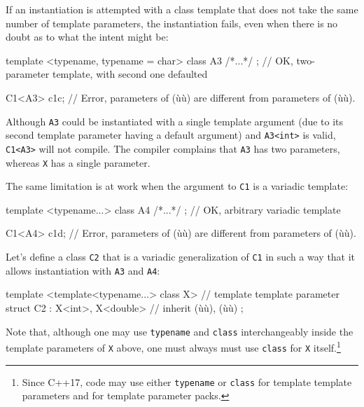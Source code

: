 If an instantiation is attempted with a class template that does not
take the same number of template parameters, the instantiation fails,
even when there is no doubt as to what the intent might be:

\begin{emcppslisting}[emcppsbatch=e24]
template <typename, typename = char>
class A3 { /*...*/ };  // OK, two-parameter template, with second one defaulted

C1<A3> c1c;  // Error, parameters of (ù{}ù) are different from parameters of (ù{}ù).
\end{emcppslisting}
    

\noindent Although \lstinline!A3! could be instantiated with a single template
argument (due to its second template parameter having a default
argument) and \lstinline!A3<int>! is valid, \lstinline!C1<A3>! will not
compile. The compiler complains that \lstinline!A3! has two parameters,
whereas \lstinline!X! has a single parameter.

The same limitation is at work when the argument to \lstinline!C1! is a
variadic template:

\begin{emcppslisting}[emcppsbatch=e24]
template <typename...>
class A4 { /*...*/ };    // OK, arbitrary variadic template

C1<A4> c1d;  // Error, parameters of (ù{}ù) are different from parameters of (ù{}ù).
\end{emcppslisting}
    

\noindent Let's define a class \lstinline!C2! that is a variadic generalization of
\lstinline!C1! in such a way that it allows instantiation with \lstinline!A3!
and \lstinline!A4!:

\begin{emcppslisting}[emcppsbatch=e24]
template <template<typename...> class X>  // template template parameter
struct C2 : X<int>, X<double>             // inherit (ù{}ù), (ù{}ù)
{ };
\end{emcppslisting}
    

\noindent Note that, although one may use \lstinline!typename! and \lstinline!class!
interchangeably inside the template parameters of \lstinline!X! above, one
must always must use \lstinline!class! for \lstinline!X!
itself.{\cprotect\footnote{Since C++17, code may use either
\lstinline!typename! or \lstinline!class! for template template parameters
  and for template parameter packs.}}

